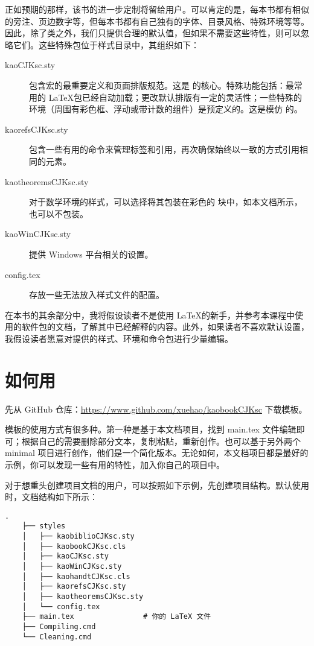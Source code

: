正如预期的那样，该书的进一步定制将留给用户。可以肯定的是，每本书都有相似的旁注、页边数字等，但每本书都有自己独有的字体、目录风格、特殊环境等等。因此，除了类之外，我们只提供合理的默认值，但如果不需要这些特性，则可以忽略它们。这些特殊包位于样式目录中，其组织如下：

\begin{description}
	\item[kaoCJKsc.sty] 包含宏的最重要定义和页面排版规范。这是 	的核心。特殊功能包括：最常用的 \LaTeX 包已经自动加载；更改默认排版有一定的灵活性；一些特殊的环境（周围有彩色框、浮动或带计数的组件）是预定义的。这是模仿  的。
	\item[kaorefsCJKsc.sty] 包含一些有用的命令来管理标签和引用，再次确保始终以一致的方式引用相同的元素。
	\item[kaotheoremsCJKsc.sty] 对于数学环境的样式，可以选择将其包装在彩色的  块中，如本文档所示，也可以不包装。
	\item[kaoWinCJKsc.sty] 提供 Windows 平台相关的设置。
	\item[config.tex] 存放一些无法放入样式文件的配置。
\end{description}


在本书的其余部分中，我将假设读者不是使用 \LaTeX 的新手，并参考本课程中使用的软件包的文档，了解其中已经解释的内容。此外，如果读者不喜欢默认设置，我假设读者愿意对提供的样式、环境和命令包进行少量编辑。

\section{如何用}

先从 GitHub 仓库：\url{https://www.github.com/xuehao/kaobookCJKsc} 下载模板。

模板的使用方式有很多种。第一种是基于本文档项目，找到 main.tex 文件编辑即可；根据自己的需要删除部分文本，复制粘贴，重新创作。也可以基于另外两个 minimal 项目进行创作，他们是一个简化版本。无论如何，本文档项目都是最好的示例，你可以发现一些有用的特性，加入你自己的项目中。

对于想重头创建项目文档的用户，可以按照如下示例，先创建项目结构。默认使用时，文档结构如下所示：

\begin{lstlisting}[style=kaolstplain]
	.
	├── styles
	│   ├── kaobiblioCJKsc.sty
	│   ├── kaobookCJKsc.cls
	│   ├── kaoCJKsc.sty
	│   ├── kaoWinCJKsc.sty
	│   ├── kaohandtCJKsc.cls
	│   ├── kaorefsCJKsc.sty
	│   ├── kaotheoremsCJKsc.sty
	│   └── config.tex
	├── main.tex                # 你的 LaTeX 文件
	├── Compiling.cmd
	└── Cleaning.cmd
\end{lstlisting}

